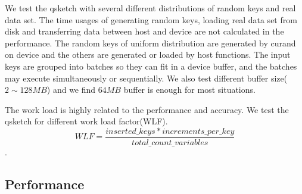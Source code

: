 \documentclass[conference]{IEEEtran}
\begin{document}
We test the qsketch with several different distributions of random keys and real data set. The time usages of generating random keys, loading real data set from disk and transferring data between host and device are not calculated in the performance. The random keys of uniform distribution are generated by curand on device and the others are generated or loaded by host functions. The input keys are grouped into batches so they can fit in a device buffer, and the batches may execute simultaneously or sequentially. We also test different buffer size($2 \sim 128 MB$) and we find $64 MB$ buffer is enough for most situations. 



The work load is highly related to the performance and accuracy. We test the qsketch for different work load factor(WLF). 
\[WLF = \frac{inserted\_keys * increments\_per\_key}{total\_count\_variables}\]. 

\subsection{Performance}

\end{document}

